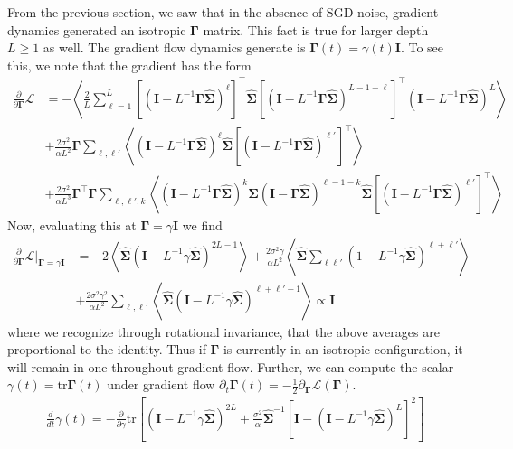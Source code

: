 \documentclass{article} %
\begin{document}
From the previous section, we saw that in the absence of SGD noise, gradient dynamics generated an isotropic $\bm\Gamma$ matrix. This fact is true for larger depth $L\geq 1$ as well. The gradient flow dynamics generate is $\bm\Gamma(t) = \gamma(t) \bm I$. To see this, we note that the gradient has the form
\begin{align}
    \frac{\partial}{\partial \bm\Gamma} \mathcal L &=  - \left< 
     \frac{2}{L} \sum_{\ell=1}^L \left[\left( \bm I - L^{-1} \bm\Gamma \hat{\bm\Sigma} \right)^{\ell}\right]^\top \hat{\bm\Sigma} \left[ \left(\bm I - L^{-1} \bm\Gamma \hat{\bm\Sigma} \right)^{L-1-\ell} \right]^\top  \left( \bm I - L^{-1} \bm\Gamma \hat{\bm\Sigma}  \right)^{L}   \right>\nonumber
     \\
     &+ \frac{2 \sigma^2}{\alpha L^2 }  \bm\Gamma  \sum_{\ell,\ell'} \left< \left( \bm I - L^{-1} \bm\Gamma \hat{\bm\Sigma} \right)^{\ell} \hat{\bm\Sigma} \left[\left( \bm I - L^{-1} \bm\Gamma \hat{\bm\Sigma} \right)^{\ell'} \right]^\top  \right> \nonumber
     \\
     &+ \frac{2 \sigma^2}{\alpha L^3 }  \bm\Gamma^\top \bm \Gamma  \sum_{\ell,\ell',k} \left< \left( \bm I - L^{-1} \bm\Gamma \hat{\bm\Sigma} \right)^{k} \hat{\bm\Sigma} \left( \bm I - \bm\Gamma \hat{\bm\Sigma} \right)^{\ell-1-k} \hat{\bm\Sigma} \left[\left( \bm I - L^{-1} \bm\Gamma \hat{\bm\Sigma} \right)^{\ell'} \right]^\top  \right>
\end{align}
Now, evaluating this at $\bm\Gamma = \gamma \bm I$ we find
\begin{align}
    \frac{\partial}{\partial \bm\Gamma} \mathcal L|_{\bm\Gamma=\gamma \bm I} &= -2 \left< \hat{\bm\Sigma} \left( \bm I - L^{-1} \gamma \hat{\bm\Sigma} \right)^{2L-1}  \right> + \frac{2\sigma^2 \gamma}{\alpha L^2}   \left< \hat{\bm\Sigma} \sum_{\ell\ell'} (1 - L^{-1} \gamma \hat{\bm\Sigma})^{\ell+\ell'} \right> \nonumber
    \\
    &+ \frac{2\sigma^2 \gamma^2 }{\alpha L^2} \sum_{\ell,\ell'} \left< \hat{\bm\Sigma} \left( \bm I - L^{-1} \gamma \hat{\bm\Sigma} \right)^{\ell+\ell'-1} \right> \propto \bm I
\end{align}
where we recognize through rotational invariance, that the above averages are proportional to the identity. Thus if $\bm\Gamma$ is currently in an isotropic configuration, it will remain in one throughout gradient flow. Further, we can compute the scalar $\gamma(t) = \text{tr} \bm\Gamma(t)$ under gradient flow $\partial_t \bm\Gamma(t) = - \frac{1}{2} \partial_{\bm\Gamma} \mathcal L(\bm\Gamma)$.
\begin{align}
    \frac{d}{dt} \gamma(t) = - \frac{\partial}{\partial \gamma} \text{tr} \left[  \left( \bm I -  L^{-1} \gamma \hat{\bm\Sigma}  \right)^{2L} + \frac{\sigma^2}{\alpha} \hat{\bm\Sigma}^{-1} \left[ \bm I -  \left( \bm I - L^{-1} \gamma \hat{\bm\Sigma}  \right)^L \right]^2  \right] 
\end{align}
\end{document}
